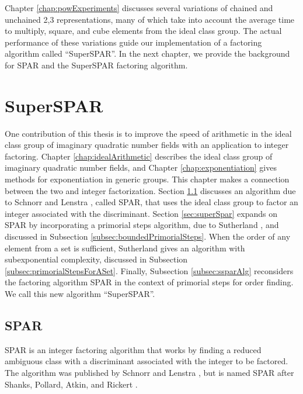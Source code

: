 \documentclass{ucalgthes1}
\theoremstyle{definition}
\begin{document}
Chapter \ref{chap:powExperiments} discusses several variations of chained and unchained 2,3 representations, many of which take into account the average time to multiply, square, and cube elements from the ideal class group.  The actual performance of these variations guide our implementation of a factoring algorithm called ``SuperSPAR''.  In the next chapter, we provide the background for SPAR and the SuperSPAR factoring algorithm.


\chapter{SuperSPAR}
\label{chap:superspar}

One contribution of this thesis is to improve the speed of arithmetic in the ideal class group of imaginary quadratic number fields with an application to integer factoring.  Chapter \ref{chap:idealArithmetic} describes the ideal class group of imaginary quadratic number fields, and Chapter \ref{chap:exponentiation} gives methods for exponentiation in generic groups.  This chapter makes a connection between the two and integer factorization.  Section \ref{sec:spar} discusses an algorithm due to Schnorr and Lenstra \cite{Schnorr1984}, called SPAR, that uses the ideal class group to factor an integer associated with the discriminant.  Section \ref{sec:superSpar} expands on SPAR by incorporating a primorial steps algorithm, due to Sutherland \cite[\S 4.1]{Sutherland2007}, and discussed in Subsection \ref{subsec:boundedPrimorialSteps}.   When the order of any element from a set is sufficient, Sutherland \cite[\S 5.4]{Sutherland2007} gives an algorithm with subexponential complexity, discussed in Subsection \ref{subsec:primorialStepsForASet}.  Finally, Subsection \ref{subsec:ssparAlg} reconsiders the factoring algorithm SPAR in the context of primorial steps for order finding.  We call this new algorithm ``SuperSPAR''.

\section{SPAR}
\label{sec:spar}

SPAR is an integer factoring algorithm that works by finding a reduced ambiguous class with a discriminant associated with the integer to be factored.  The algorithm was published by Schnorr and Lenstra \cite{Schnorr1984}, but is named SPAR after Shanks, Pollard, Atkin, and Rickert \cite[p.484]{Lenstra1992}.
\end{document}
